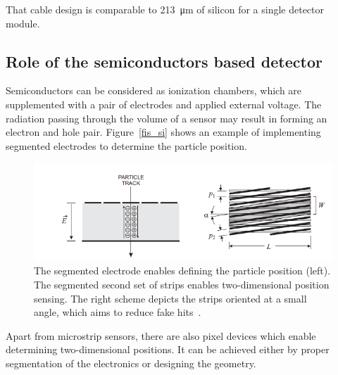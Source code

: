 


That cable design is comparable to \SI{213}{\micro\metre} of silicon for a single detector module.




\subsection{Role of the semiconductors based detector}

Semiconductors can be considered as ionization chambers, which are supplemented with a pair of electrodes and applied external voltage. The radiation passing through the volume of a sensor may result in forming an electron and hole pair. Figure~\ref{fis_si} shows an example of implementing segmented electrodes to determine the particle position. 

\begin{figure}[!h]
\centering
\includegraphics[width=1\columnwidth]{Chapter2/images/silicons.png}
\caption{The segmented electrode enables defining the particle position (left). The segmented second set of strips enables two-dimensional position sensing. The right scheme depicts the strips oriented at a small angle, which aims to reduce fake hits~\cite{Spieler}.}
\label{fig_si}
\end{figure}

Apart from microstrip sensors, there are also pixel devices which enable determining two-dimensional positions. It can be achieved either by proper segmentation of the electronics or designing the geometry.  


